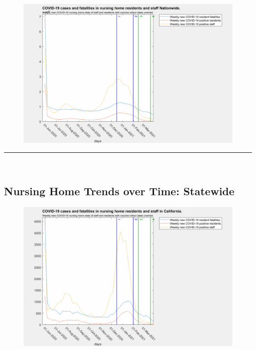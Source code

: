 \documentclass[twoside]{article}
\begin{document}
\begin{multicols}{2}
\begin{figure}[H]
	\includegraphics[width=\linewidth]{images/nationwide_nursing_home_with_vaccine.png}
	\caption{}
	\label{fig:images/nationwide_nursing_home_with_vaccineLabel}
\end{figure}
\rule{\linewidth}{0.5pt}\\
\subsection{Nursing Home Trends over Time: Statewide}

\begin{figure}[H]
	\includegraphics[width=\linewidth]{images/california_nursing_home_with_vaccine.png}
	\caption{}
	\label{fig:images/california_nursing_home_with_vaccineLabel}
\end{figure}


\end{multicols}
\end{document}
